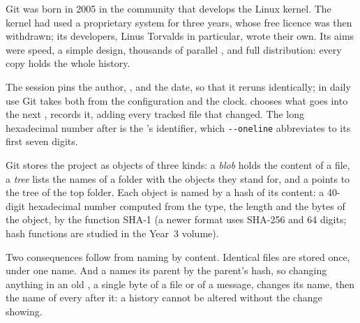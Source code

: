 \begin{history}[Git]
Git was born in 2005 in the community that develops the Linux kernel. The kernel had used a proprietary system for
three years, whose free licence was then withdrawn; its developers, Linus Torvalds in particular, wrote their own. Its
aims were speed, a simple design, thousands of parallel , and full distribution: every copy holds the whole
history.
\end{history}

\label{out:b1:version-control:first}

The session pins the author, , and the date, so that it reruns identically; in daily use Git takes
both from the configuration and the clock.  chooses what goes into the next , 
records it,  adding every tracked file that changed. The long hexadecimal number after  is the
's identifier, which \texttt{-{}-{}oneline} abbreviates to its first seven digits.

Git stores the project as objects of three kinds: a \emph{blob} holds the content of a file, a \emph{tree} lists the
names of a folder with the objects they stand for, and a  points to the tree of the top folder. Each object is
named by a hash of its content: a 40-digit hexadecimal number computed from the type, the length and the bytes of the
object, by the function SHA-1 (a newer format uses SHA-256 and 64 digits; hash functions are studied in the Year~3
volume).

\label{out:b1:version-control:objects}

Two consequences follow from naming by content. Identical files are stored once, under one name. And a  names
its parent by the parent's hash, so changing anything in an old , a single byte of a file or of a message,
changes its name, then the name of every  after it: a history cannot be altered without the change showing.

